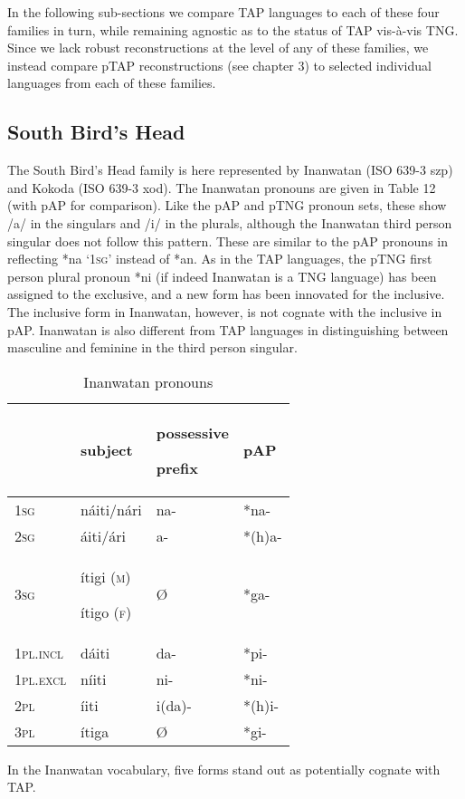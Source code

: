 In the following sub-sections we compare TAP languages to each of these four families in turn, while remaining agnostic as to the status of TAP vis-\`a-vis TNG. Since we lack robust reconstructions at the level of any of these families, we instead compare pTAP reconstructions (see chapter 3) to selected individual languages from each of these families.

\subsection{South Bird's Head}
The South Bird's Head family is here represented by Inanwatan (ISO 639-3 szp) and Kokoda (ISO 639-3 xod). The Inanwatan pronouns are given in Table 12 (with pAP for comparison). Like the pAP and pTNG pronoun sets, these show /a/ in the singulars and /i/ in the plurals, although the Inanwatan third person singular does not follow this pattern. These are similar to the pAP pronouns in reflecting *na `\textsc{1sg}' instead of *an. As in the TAP languages, the pTNG first person plural pronoun *ni (if indeed Inanwatan is a TNG language) has been assigned to the exclusive, and a new form has been innovated for the inclusive. The inclusive form in Inanwatan, however, is not cognate with the inclusive in pAP. Inanwatan is also different from TAP languages in distinguishing between masculine and feminine in the third person singular.


\begin{table}\centering


\begin{tabular}{llll}
\hline&subject&possessive

prefix&pAP\\\hline
\textsc{1sg}&n\'aiti/n\'ari&na-&*na-\\
\textsc{2sg}&\'aiti/\'ari&a-&*(h)a-\\
\textsc{3sg}&\'itigi (\textsc{m})

\'itigo (\textsc{f})&{\O}&*ga-\\
\textsc{1pl.incl}&d\'aiti&da-&*pi-\\
\textsc{1pl.excl}&n\'iiti&ni-&*ni-\\
\textsc{2pl}&\'iiti&i(da)-&*(h)i-\\
\textsc{3pl}&\'itiga&{\O}&*gi-\\

\end{tabular}

\caption{Inanwatan pronouns \citep[27-29]{DeVries2004}}
\end{table}
In the Inanwatan vocabulary, five forms stand out as potentially cognate with TAP.

